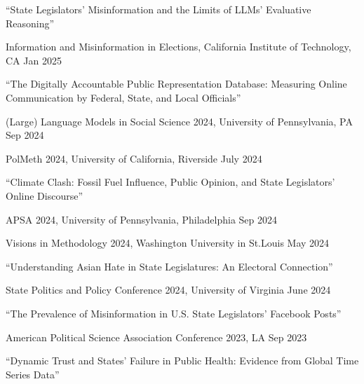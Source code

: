 \documentclass[10.5pt,]{article}
\providecommand{\tightlist}{%
	\setlength{\itemsep}{0pt}\setlength{\parskip}{0pt}}
\renewenvironment{itemize}{
	\begin{list}{}{
			\setlength{\leftmargin}{1.5em}
		}
	}{
	\end{list}
}
\begin{document}
\begin{itemize}
\tightlist
\item
  ``State Legislators' Misinformation and the Limits of LLMs' Evaluative
  Reasoning''

  \begin{itemize}
  \tightlist
  \item
    Information and Misinformation in Elections, California Institute of
    Technology, CA \hfill Jan 2025
  \end{itemize}
\item
  ``The Digitally Accountable Public Representation Database: Measuring
  Online Communication by Federal, State, and Local Oﬀicials''

  \begin{itemize}
  \tightlist
  \item
    (Large) Language Models in Social Science 2024, University of
    Pennsylvania, PA \hfill Sep 2024
  \item
    PolMeth 2024, University of California, Riverside \hfill July 2024
  \end{itemize}
\item
  ``Climate Clash: Fossil Fuel Influence, Public Opinion, and State
  Legislators' Online Discourse''

  \begin{itemize}
  \tightlist
  \item
    APSA 2024, University of Pennsylvania, Philadelphia \hfill Sep 2024
  \item
    Visions in Methodology 2024, Washington University in St.Louis
    \hfill May 2024
  \end{itemize}
\item
  ``Understanding Asian Hate in State Legislatures: An Electoral
  Connection''

  \begin{itemize}
  \tightlist
  \item
    State Politics and Policy Conference 2024, University of Virginia
    \hfill June 2024
  \end{itemize}
\item
  ``The Prevalence of Misinformation in U.S. State Legislators' Facebook
  Posts''

  \begin{itemize}
  \tightlist
  \item
    American Political Science Association Conference 2023, LA
    \hfill Sep 2023
  \end{itemize}
\item
  ``Dynamic Trust and States' Failure in Public Health: Evidence from
  Global Time Series Data''


\end{itemize}
\end{document}
